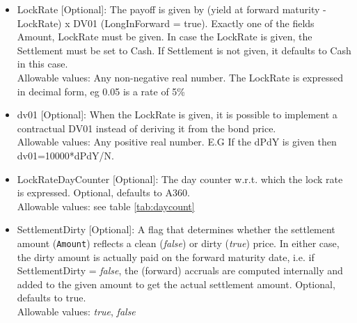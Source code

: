 \begin{itemize}
\begin{itemize}
       \begin{sloppypar}  
       (a) the bond (physical delivery) or \\
       \end{sloppypar} 
       \begin{sloppypar} 
         (b) a cash amount equal to the dirty price of the bond (cash settlement). \\
        \end{sloppypar} 
         This is
         transferred from the party that is long to the party that is short (determined by \lstinline!LongInForward!)
         and cannot be a negative amount. It is assumed to be in the same currency as the underlying bond. Exactly one
         of the fields Amount, LockRate must be given. \\
         Allowable values: Any non-negative real number. 
       \item LockRate [Optional]: The payoff is given by (yield at forward maturity - LockRate) x DV01 (LongInForward =
         true). Exactly one of the fields Amount, LockRate must be given. In case the LockRate is given, the Settlement
         must be set to Cash. If Settlement is not given, it defaults to Cash in this case. \\
         Allowable values: Any non-negative real number. The LockRate is expressed in decimal form, eg 0.05 is a rate of 5\%
       \item dv01 [Optional]: When the LockRate is given, it is possible to implement a contractual DV01 instead of deriving it from the bond price. \\
         Allowable values: Any positive real number. E.G If the dPdY is given then dv01=10000*dPdY/N.
       \item LockRateDayCounter [Optional]: The day counter w.r.t. which the lock rate is expressed. Optional, defaults to A360. \\
         Allowable values: see table \ref{tab:daycount}
       \item SettlementDirty [Optional]: A flag that determines whether the settlement amount {({\tt Amount})} reflects
         a clean (\emph{false}) or dirty (\emph{true}) price. In either case, the dirty amount is actually paid on the
         forward maturity date, i.e. if SettlementDirty = \emph{false}, the (forward) accruals are computed internally
         and added to the given amount to get the actual settlement amount. Optional, defaults to true. \\
         Allowable values: \emph{true}, \emph{false}

\end{itemize}
\end{itemize}

